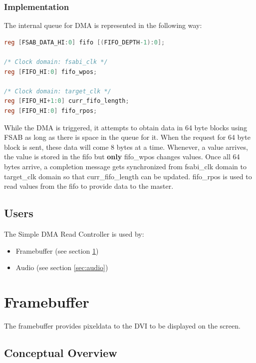 \documentclass[10pt]{article}
\begin{document}
\subsubsection{Implementation}

The internal queue for DMA is represented in the following way:

\begin{lstlisting}[basicstyle=\footnotesize,language=Verilog]
reg [FSAB_DATA_HI:0] fifo [(FIFO_DEPTH-1):0];
 
/* Clock domain: fsabi_clk */
reg [FIFO_HI:0] fifo_wpos;
 
/* Clock domain: target_clk */
reg [FIFO_HI+1:0] curr_fifo_length;
reg [FIFO_HI:0] fifo_rpos;
\end{lstlisting}

While the DMA is triggered, it attempts to obtain data in 64 byte blocks
using FSAB as long as there is space in the queue for it. When the request
for 64 byte block is sent, these data will come 8 bytes at a time. Whenever,
a value arrives, the value is stored in the fifo but \textbf{only} fifo\_wpos changes
values. Once all 64 bytes arrive, a completion message gets synchronized
from fsabi\_clk domain to target\_clk domain so that curr\_fifo\_length can be
updated. fifo\_rpos is used to read values from the fifo to provide data to
the master.

\subsection{Users}

The Simple DMA Read Controller is used by:

\begin{itemize}
\item{Framebuffer (see section \ref{sec:framebuffer})}
\item{Audio (see section \ref{sec:audio})}
\end{itemize}

\section{Framebuffer}
\label{sec:framebuffer}

The framebuffer provides pixeldata to the DVI to be displayed on the screen.

\subsection{Conceptual Overview}
\end{document}
